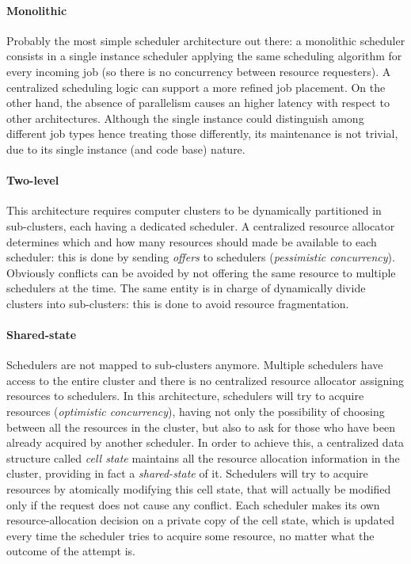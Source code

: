 \paragraph{Monolithic}
Probably the most simple scheduler architecture out there: a monolithic scheduler consists in a single instance scheduler applying the same scheduling algorithm for every incoming job (so there is no concurrency between resource requesters).
A centralized scheduling logic can support a more refined job placement.
On the other hand, the absence of parallelism causes an higher latency with respect to other architectures.
Although the single instance could distinguish among different job types hence treating those differently, its maintenance is not trivial, due to its single instance (and code base) nature.

\paragraph{Two-level}
This architecture requires computer clusters to be dynamically partitioned in sub-clusters, each having a dedicated scheduler.
A centralized resource allocator determines which and how many resources should made be available to each scheduler: this is done by sending \textit{offers} to schedulers (\textit{pessimistic concurrency}).
Obviously conflicts can be avoided by not offering the same resource to multiple schedulers at the time.
The same entity is in charge of dynamically divide clusters into sub-clusters: this is done to avoid resource fragmentation.

\paragraph{Shared-state}
Schedulers are not mapped to sub-clusters anymore.
Multiple schedulers have access to the entire cluster and there is no centralized resource allocator assigning resources to schedulers.
In this architecture, schedulers will try to acquire resources (\textit{optimistic concurrency}), having not only the possibility of choosing between all the resources in the cluster, but also to ask for those who have been already acquired by another scheduler.
In order to achieve this, a centralized data structure called \textit{cell state} maintains all the resource allocation information in the cluster, providing in fact a \textit{shared-state} of it.
Schedulers will try to acquire resources by atomically modifying this cell state, that will actually be modified only if the request does not cause any conflict.
Each scheduler makes its own resource-allocation decision on a private copy of the cell state, which is updated every time the scheduler tries to acquire some resource, no matter what the outcome of the attempt is.